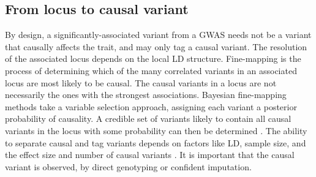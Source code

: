 \begin{outline}
%
%
%
%
%

\subsection{From locus to causal variant}

By design, a significantly-associated variant from a \gls{GWAS} needs not be a variant that causally affects the trait, and may only tag a causal variant.
The resolution of the associated locus depends on the local \gls{LD} structure.
Fine-mapping is the process of determining which of the many correlated variants in an associated locus are most likely to be causal.
The causal variants in a locus are not necessarily the ones with the strongest associations.
Bayesian fine-mapping methods take a variable selection approach, 
assigning each variant a posterior probability of causality.
A credible set of variants likely to contain all causal variants in the locus with some probability can then be determined \autocite{schaid2018GenomewideAssociationsCandidate,wang2020SimpleNewApproach}.
The ability to separate causal and tag variants depends on factors like \gls{LD}, sample size, and the effect size and number of causal variants  \autocite{visscher201710YearsGWAS,schaid2018GenomewideAssociationsCandidate}.
It is important that the causal variant is observed, by direct genotyping or confident imputation.


\end{outline}
